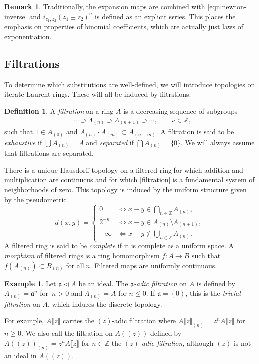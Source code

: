 \documentclass[pdftex]{sigma}
\numberwithin{equation}{section}
\theoremstyle{definition}
\newtheorem{Definition}[Theorem]{Definition}
\newtheorem{Example}[Theorem]{Example}
\newtheorem{Remark}[Theorem]{Remark}
\def\lb{\llbracket}
\def\rb{\rrbracket}
\begin{document}
\begin{Remark}
 Traditionally, the expansion maps are combined with \eqref{eqn:newton-inverse} and $i_{z_1,z_2}(z_1\pm z_2)^n$ is defined as an explicit series. This places the emphasis on properties of binomial coefficients, which are actually just laws of exponentiation.
\end{Remark}

\subsection{Filtrations}\label{s33}

 To determine which substitutions are well-defined, we will introduce topologies on iterate Laurent rings. These will all be induced by filtrations.

\begin{Definition}
A \emph{filtration} on a ring $A$ is a decreasing sequence of subgroups
\begin{align}\label{filtration}
&\cdots\supset A_{(n)}\supset A_{(n+1)}\supset\cdots,\qquad n\in\mathbb{Z},
\end{align}
such that $1\in A_{(0)}$ and $A_{(n)}\cdot A_{(m)}\subset A_{(n+m)}$. A filtration is said to be \emph{exhaustive} if $\bigcup A_{(n)}=A$ and \emph{separated} if $\bigcap A_{(n)}=\{0\}$. We will always assume that filtrations are separated.
\end{Definition}

 There is a unique Hausdorff topology on a filtered ring for which addition and multiplication are continuous and for which \eqref{filtration} is a fundamental system of neighborhoods of zero. This topology is induced by the uniform structure given by the pseudometric
\[
 d(x,y)=
 \begin{cases}
 0 & {\iff} x-y\in\bigcap_{n\in\mathbb{Z}} A_{(n)},\\
 2^{-n} & {\iff} x-y \in A_{(n)}\setminus A_{(n+1)},\\
 +\infty & {\iff} x-y \notin\bigcup_{n\in\mathbb{Z}} A_{(n)}.
 \end{cases}
\]
A filtered ring is said to be \emph{complete} if it is complete as a uniform space. A \emph{morphism} of filtered rings is a ring homomorphism $f\colon A\to B$ such that $f(A_{(n)})\subset B_{(n)}$ for all $n$. Filtered maps are uniformly continuous.


\begin{Example}
 Let $\mathfrak{a}\triangleleft A$ be an ideal. The \emph{$\mathfrak{a}$-adic filtration} on $A$ is defined by $A_{(n)}=\mathfrak{a}^n$ for~${n>0}$ and $A_{(n)}=A$ for $n\leqslant0$. If $\mathfrak{a}=(0)$, this is the \emph{trivial filtration} on $A$, which induces the discrete topology.

 For example, $A\lb z\rb$ carries the $(z)$-adic filtration where $A\lb z\rb_{(n)}=z^nA\lb z\rb$ for $n\geqslant0$. We also call the filtration on $A(\!( z)\!)$ defined by $A(\!( z)\!)_{(n)}=z^nA\lb z\rb$ for $n\in\mathbb{Z}$ the \emph{$(z)$-adic filtration}, although $(z)$ is not an ideal in $A(\!( z)\!)$.
\end{Example}
\end{document}
